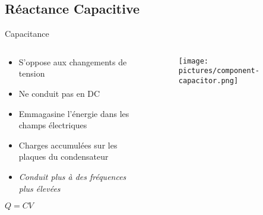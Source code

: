 \subsection{Réactance Capacitive}
\begin{frame}{Capacitance}
    \begin{columns}
        \begin{column}{0.66\textwidth}
            \begin{itemize}
                \item S'oppose aux changements de tension
                \item Ne conduit pas en DC
                \item Emmagasine l'énergie dans les champs électriques
                \item Charges accumulées sur les plaques du condensateur
                \item \textit{Conduit plus à des fréquences plus élevées}
            \end{itemize}
            \par
            \begin{center}
                \Large{$Q = CV$}
            \end{center}
        \end{column}
        \begin{column}{0.33\textwidth}
            \begin{figure}
                \centering
                \texttt{[image: pictures/component-capacitor.png]}
            \end{figure}
        \end{column}
    \end{columns}
\end{frame}

